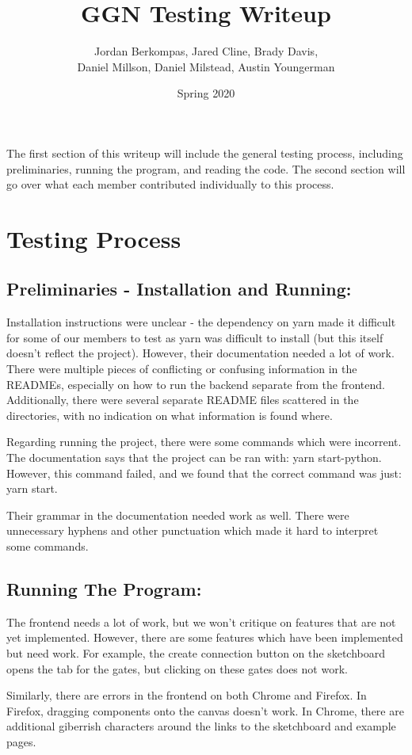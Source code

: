 \documentclass[11pt]{article}
\author{Jordan Berkompas, Jared Cline, Brady Davis, \\ Daniel Millson, Daniel Milstead, Austin Youngerman}
\date{Spring 2020}
\title{GGN Testing Writeup}
\begin{document}
    \maketitle
    The first section of this writeup will include the general testing process, including preliminaries, running the program, and reading the code. The second section will go over what each member contributed individually to this process.
    \section*{Testing Process}
        \subsection*{Preliminaries - Installation and Running:}
            Installation instructions were unclear - the dependency on yarn made it difficult for some of our members to test as yarn was difficult to install (but this itself doesn't reflect the project). However, their documentation needed a lot of work. There were multiple pieces of conflicting or confusing information in the READMEs, especially on how to run the backend separate from the frontend. Additionally, there were several separate README files scattered in the directories, with no indication on what information is found where. 

            Regarding running the project, there were some commands which were incorrent. The documentation says that the project can be ran with: yarn start-python. However, this command failed, and we found that the correct command was just: yarn start. 

            Their grammar in the documentation needed work as well. There were unnecessary hyphens and other punctuation which made it hard to interpret some commands.

        \subsection*{Running The Program:}
            The frontend needs a lot of work, but we won't critique on features that are not yet implemented. However, there are some features which have been implemented but need work. For example, the create connection button on the sketchboard opens the tab for the gates, but clicking on these gates does not work. 

            Similarly, there are errors in the frontend on both Chrome and Firefox. In Firefox, dragging components onto the canvas doesn't work. In Chrome, there are additional giberrish characters around the links to the sketchboard and example pages.
\end{document}

